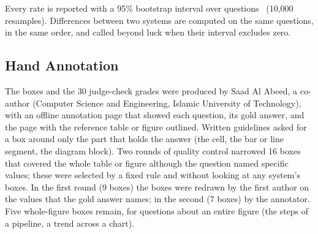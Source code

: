 \noindent Every rate is reported with a 95\% bootstrap interval over
questions~\cite{efron1993bootstrap} (10{,}000 resamples). Differences between two
systems are computed on the same questions, in the same order, and called beyond luck
when their interval excludes zero.

\subsection{Hand Annotation}
\label{sec:annotation}

The boxes and the 30 judge-check grades were produced by Saad Al Abeed, a co-author
(Computer Science and Engineering, Islamic University of Technology), with an offline
annotation page that showed each question, its gold answer, and the page with the
reference table or figure outlined. Written guidelines asked for a box around only the
part that holds the answer (the cell, the bar or line segment, the diagram block).
Two rounds of quality control narrowed 16 boxes that covered the whole table or figure
although the question named specific values; these were selected by a fixed rule and
without looking at any system's boxes. In the first round (9 boxes) the boxes were
redrawn by the first author on the values that the gold answer names; in the second
(7 boxes) by the annotator. Five whole-figure boxes remain, for questions
about an entire figure (the steps of a pipeline, a trend across a chart).
